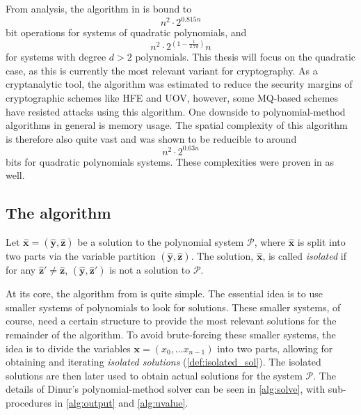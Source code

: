 From analysis, the algorithm in \cite{eurocrypt-2021-30841} is bound to 
$$
    n^2 \cdot 2^{0.815n}
$$ 
bit operations for systems of quadratic polynomials, and 
$$
    n^2 \cdot 2^{(1 - \frac{1}{2.7d})}n
$$ 
for systems with degree $d > 2$ polynomials. This thesis will focus on the quadratic case, as this is currently the most relevant variant for cryptography. As a cryptanalytic tool, the algorithm was estimated to reduce the security margins of cryptographic schemes like HFE and UOV, however, some MQ-based schemes have resisted attacks using this algorithm. One downside to polynomial-method algorithms in general is memory usage. The spatial complexity of this algorithm is therefore also quite vast and was shown to be reducible to around 
$$
    n^2 \cdot 2^{0.63n}
$$ 
bits for quadratic polynomials systems. These complexities were proven in \cite{eurocrypt-2021-30841} as well.

\subsection{The algorithm} \label{sec:dinur:dinur_alg}
\begin{defn} \label{def:isolated_sol}
    Let $\hat{\mathbf{x}} = (\hat{\mathbf{y}}, \hat{\mathbf{z}})$ be a solution to the polynomial system $\mathcal{P}$, where $\hat{\mathbf{x}}$ is split into two parts via the variable partition $(\hat{\mathbf{y}}, \hat{\mathbf{z}})$. The solution, $\hat{\mathbf{x}}$, is called \textit{isolated} if for any $\hat{\mathbf{z}}' \neq \hat{\mathbf{z}}$, $(\hat{\mathbf{y}}, \hat{\mathbf{z}}')$ is not a solution to $\mathcal{P}$.
\end{defn}

At its core, the algorithm from \cite{eurocrypt-2021-30841} is quite simple. The essential idea is to use smaller systems of polynomials to look for solutions. These smaller systems, of course, need a certain structure to provide the most relevant solutions for the remainder of the algorithm. To avoid brute-forcing these smaller systems, the idea is to divide the variables $\mathbf{x} = (x_0, \dots x_{n - 1})$ into two parts, allowing for obtaining and iterating \textit{isolated solutions} (\cref{def:isolated_sol}). The isolated solutions are then later used to obtain actual solutions for the system $\mathcal{P}$. The details of Dinur's polynomial-method solver can be seen in \cref{alg:solve}, with sub-procedures in \cref{alg:output} and \cref{alg:uvalue}.


